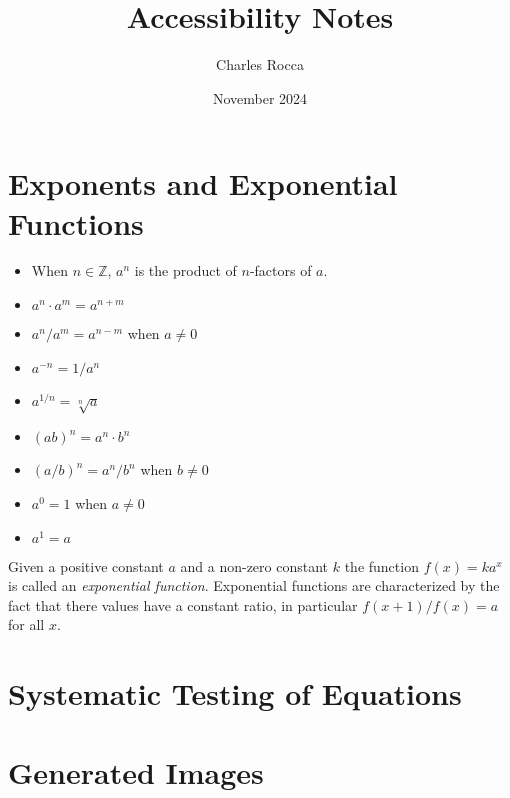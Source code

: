 \documentclass{article}
\title{Accessibility Notes}
\author{Charles Rocca}
\date{November 2024}
\begin{document}
\maketitle

\section{Exponents and Exponential Functions}
\begin{expository}\label{expo:exponent rules}
    \begin{itemize}
        \item When \(n\in\mathbb{Z}\), \(a^n\) is the product of \(n\)-factors of \(a\).
        \item \(a^n\cdot a^m=a^{n+m}\)
        \item \(a^n/a^m = a^{n-m}\) when \(a\neq 0\)
        \item \(a^{-n}=1/a^n\)
        \item \(a^{1/n}=\sqrt[n]{a}\)
        \item \((ab)^n=a^n\cdot b^n\)
        \item \((a/b)^n=a^n/b^n\) when \(b\neq 0\)
        \item \(a^0=1\) when \(a\neq 0\)
        \item \(a^1=a\)
    \end{itemize}
\end{expository}

\begin{defn}
    Given a positive constant \(a\) and a non-zero constant \(k\) the function \(f(x)=ka^x\) is called an \emph{exponential function}.  Exponential functions are characterized by the fact that there values have a constant ratio, in particular \(f(x+1)/f(x)=a\) for all \(x\).
\end{defn}



\section{Systematic Testing of Equations}


\section{Generated Images}
\end{document}
